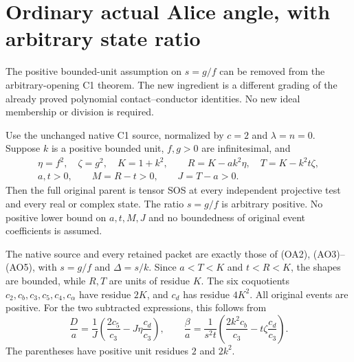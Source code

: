 \section{Ordinary actual Alice angle, with arbitrary state ratio}
\label{sec:c1-arbitrary-state-ratio}

The positive bounded-unit assumption on $s=g/f$ can be removed from
the arbitrary-opening C1 theorem. The new ingredient is a different
grading of the already proved polynomial contact--conductor identities.
No new ideal membership or division is required.

\begin{theorem}
Use the unchanged native C1 source, normalized by $c=2$ and
$\lambda=n=0$. Suppose $k$ is a positive bounded unit, $f,g>0$ are
infinitesimal, and
\[
 \begin{gathered}
 \eta=f^2,\quad\zeta=g^2,\quad K=1+k^2,\qquad
 R=K-ak^2\eta,\quad T=K-k^2t\zeta,\\
 a,t>0,\qquad M=R-t>0,\qquad J=T-a>0.
 \end{gathered}
 \tag{AS1}
\]
Then the full original parent is tensor SOS at every independent
projective test and every real or complex state. The ratio $s=g/f$
is arbitrary positive. No positive lower bound on $a,t,M,J$ and no
boundedness of original event coefficients is assumed.
\end{theorem}

The native source and every retained packet are exactly those of
(OA2), (AO3)--(AO5), with $s=g/f$ and $\Delta=s/k$. Since
$a<T<K$ and $t<R<K$, the shapes are bounded, while $R,T$ are units
of residue $K$. The six coquotients $c_2,c_b,c_3,c_5,c_4,c_\alpha$
have residue $2K$, and $c_d$ has residue $4K^2$.
All original events are positive. For the two subtracted expressions,
this follows from
\[
 \frac Da=\frac1J\left(\frac{2c_5}{c_3}
                   -J\eta\frac{c_d}{c_3}\right),\qquad
 \frac\beta a=\frac1{s^2t}
      \left(\frac{2k^2c_b}{c_3}-t\zeta\frac{c_d}{c_3}\right).
 \tag{AS2}
\]
The parentheses have positive unit residues $2$ and $2k^2$.

